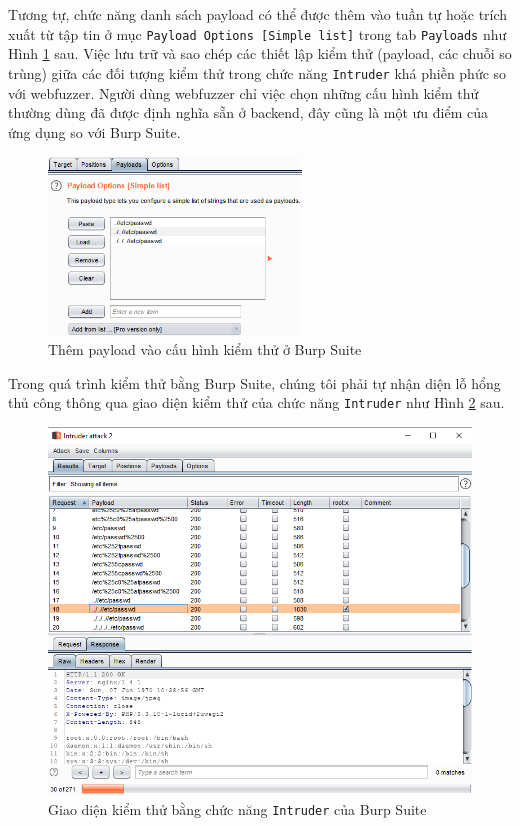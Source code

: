 Tương tự, chức năng danh sách payload có thể được thêm vào tuần tự hoặc trích xuất từ tập tin ở mục \texttt{Payload Options [Simple list]} trong tab \texttt{Payloads} như Hình \ref{fig:setup-payload-list} sau. Việc lưu trữ và sao chép các thiết lập kiểm thử (payload, các chuỗi so trùng) giữa các đối tượng kiểm thử trong chức năng \texttt{Intruder} khá phiền phức so với webfuzzer. Người dùng webfuzzer chỉ việc chọn những cấu hình kiểm thử thường dùng đã được định nghĩa sẵn ở backend, đây cũng là một ưu điểm của ứng dụng so với Burp Suite.
\begin{figure}[H]
    \centering
        \includegraphics[width=0.6\textwidth,keepaspectratio=true]{images/setup-payload-list.png}
    \caption{Thêm payload vào cấu hình kiểm thử ở Burp Suite}
    \label{fig:setup-payload-list}
\end{figure}
Trong quá trình kiểm thử bằng Burp Suite, chúng tôi phải tự nhận diện lỗ hổng thủ công thông qua giao diện kiểm thử của chức năng \texttt{Intruder} như Hình \ref{fig:fuzzing-burp} sau.
\begin{figure}[H]
    \centering
        \includegraphics[width=\textwidth,keepaspectratio=true]{images/fuzzing-burp.png}
    \caption{Giao diện kiểm thử bằng chức năng \texttt{Intruder} của Burp Suite}
    \label{fig:fuzzing-burp}
\end{figure}
